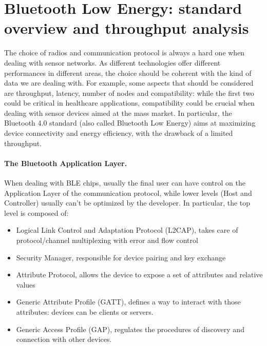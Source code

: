 \section{Bluetooth Low Energy: standard overview and throughput analysis}
The choice of radios and communication protocol is always a hard one when dealing with sensor networks. As different technologies offer different performances in different areas, the choice should be coherent with the kind of data we are dealing with. For example, some aspects that should be considered are throughput, latency, number of nodes and compatibility: while the first two could be critical in healthcare applications, compatibility could be crucial when dealing with sensor devices aimed at the mass market. In particular, the Bluetooth 4.0 standard (also called  Bluetooth Low Energy) aims at maximizing device connectivity and energy efficiency, with the drawback of a limited throughput.

\paragraph{The Bluetooth Application Layer.} When dealing with BLE chips, usually the final user can have control on the Application Layer of the communication protocol, while lower levels (Host and Controller) usually can't be optimized by the developer. In particular, the top level is composed of:
\begin{itemize}
    \item Logical Link Control and Adaptation Protocol (L2CAP), takes care of protocol/channel multiplexing with error and flow control
    \item Security Manager, responsible for device pairing and key exchange
    \item Attribute Protocol, allows the device to expose a set of attributes and relative values
    \item Generic Attribute Profile (GATT), defines a way to interact with those attributes: devices can be clients or servers. 
    \item Generic Access Profile (GAP), regulates the procedures of discovery and connection with other devices.
\end{itemize}
